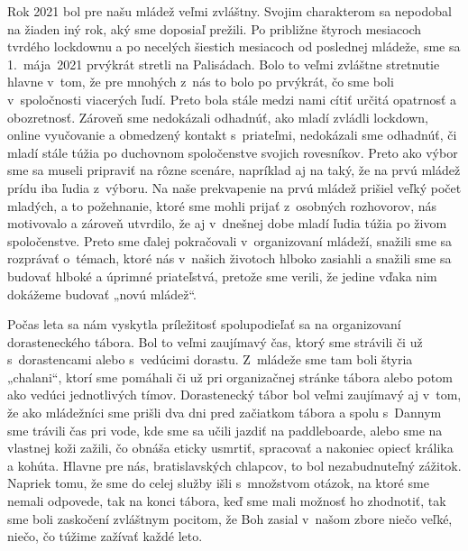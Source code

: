 Rok 2021 bol pre našu mládež veľmi zvláštny. Svojim charakterom sa nepodobal na žiaden iný rok, aký sme doposiaľ prežili. Po približne štyroch mesiacoch tvrdého lockdownu a po necelých šiestich mesiacoch od poslednej mládeže, sme sa 1.~mája~2021 prvýkrát stretli na Palisádach. Bolo to veľmi zvláštne stretnutie hlavne v~tom, že pre mnohých z~nás to bolo po prvýkrát, čo sme boli v~spoločnosti viacerých ľudí. Preto bola stále medzi nami cítiť určitá opatrnosť a obozretnosť. Zároveň sme nedokázali odhadnúť, ako mladí zvládli lockdown, online vyučovanie a obmedzený kontakt s~priateľmi, nedokázali sme odhadnúť, či mladí stále túžia po duchovnom spoločenstve svojich rovesníkov. Preto ako výbor sme sa museli pripraviť na rôzne scenáre, napríklad aj na taký, že na prvú mládež prídu iba ľudia z~výboru. Na naše prekvapenie na prvú mládež prišiel veľký počet mladých, a to požehnanie, ktoré sme mohli prijať z~osobných rozhovorov, nás motivovalo a zároveň utvrdilo, že aj v~dnešnej dobe mladí ľudia túžia po živom spoločenstve. Preto sme ďalej pokračovali v~organizovaní mládeží, snažili sme sa rozprávať o~témach, ktoré nás v~našich životoch hlboko zasiahli a snažili sme sa budovať hlboké a úprimné priateľstvá, pretože sme verili, že jedine vďaka nim dokážeme budovať „novú mládež“.

Počas leta sa nám vyskytla príležitosť spolupodieľať sa na organizovaní dorasteneckého tábora. Bol to veľmi zaujímavý čas, ktorý sme strávili či už s~dorastencami alebo s~vedúcimi dorastu. Z~mládeže sme tam boli štyria „chalani“, ktorí sme pomáhali či už pri organizačnej stránke tábora alebo potom ako vedúci jednotlivých tímov. Dorastenecký tábor bol veľmi zaujímavý aj v~tom, že ako mládežníci sme prišli dva dni pred začiatkom tábora a spolu s~Dannym sme trávili čas pri vode, kde sme sa učili jazdiť na paddleboarde, alebo sme na vlastnej koži zažili, čo obnáša eticky usmrtiť, spracovať a nakoniec opiecť králika a kohúta. Hlavne pre nás, bratislavských chlapcov, to bol nezabudnuteľný zážitok. Napriek tomu, že sme do celej služby išli s~množstvom otázok, na ktoré sme nemali odpovede, tak na konci tábora, keď sme mali možnosť ho zhodnotiť, tak sme boli zaskočení zvláštnym pocitom, že Boh zasial v~našom zbore niečo veľké, niečo, čo túžime zažívať každé leto.

